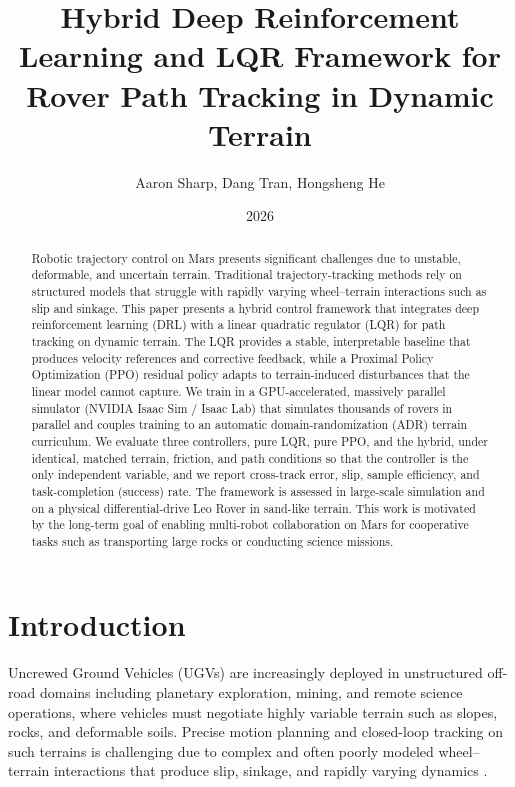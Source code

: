 \documentclass[conference]{IEEEtran}
\title{Hybrid Deep Reinforcement Learning and LQR Framework for Rover Path Tracking in Dynamic Terrain}
\author{Aaron Sharp, Dang Tran, Hongsheng He}
\date{2026}
\begin{document}
\maketitle

\begin{abstract}
Robotic trajectory control on Mars presents significant challenges due to unstable, deformable, and uncertain terrain. Traditional trajectory-tracking methods rely on structured models that struggle with rapidly varying wheel--terrain interactions such as slip and sinkage. This paper presents a hybrid control framework that integrates deep reinforcement learning (DRL) with a linear quadratic regulator (LQR) for path tracking on dynamic terrain. The LQR provides a stable, interpretable baseline that produces velocity references and corrective feedback, while a Proximal Policy Optimization (PPO) residual policy adapts to terrain-induced disturbances that the linear model cannot capture. We train in a GPU-accelerated, massively parallel simulator (NVIDIA Isaac Sim / Isaac Lab) that simulates thousands of rovers in parallel and couples training to an automatic domain-randomization (ADR) terrain curriculum. We evaluate three controllers, pure LQR, pure PPO, and the hybrid, under identical, matched terrain, friction, and path conditions so that the controller is the only independent variable, and we report cross-track error, slip, sample efficiency, and task-completion (success) rate. The framework is assessed in large-scale simulation and on a physical differential-drive Leo Rover in sand-like terrain. This work is motivated by the long-term goal of enabling multi-robot collaboration on Mars for cooperative tasks such as transporting large rocks or conducting science missions.
\end{abstract}

\section{Introduction}
Uncrewed Ground Vehicles (UGVs) are increasingly deployed in unstructured off-road domains including planetary exploration, mining, and remote science operations, where vehicles must negotiate highly variable terrain such as slopes, rocks, and deformable soils. Precise motion planning and closed-loop tracking on such terrains is challenging due to complex and often poorly modeled wheel--terrain interactions that produce slip, sinkage, and rapidly varying dynamics \cite{mehta2024hybrid, wiberg2021rough, bekker1969introduction}.
\end{document}
